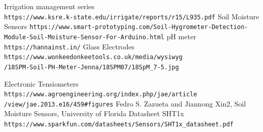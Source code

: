 \documentclass[11pt]{article}
\begin{document}
\begin{thebibliography}{9}
Irrigation management series\\
\texttt{https://www.ksre.k-state.edu/irrigate/reports/r15/L935.pdf}
Soil Moisture Sensors
\texttt{https://www.smart-prototyping.com/Soil-Hygrometer-Detection-\\Module-Soil-Moisture-Sensor-For-Arduino.html}
pH meter \\
\texttt{https://hannainst.in/}
Glass Electrodes
\texttt{https://www.wonkeedonkeetools.co.uk/media/wysiwyg\\/18SPM-Soil-PH-Meter-Jenna/18SPM07/18SpM_7-5.jpg}

Electronic Tensiometers
\texttt{https://www.agroengineering.org/index.php/jae/article\\/view/jae.2013.e16/459#figures}
Fedro S. Zazueta and Jiannong Xin2, Soil Moisture Sensors, University of Florida
Datasheet SHT1x
\texttt{https://www.sparkfun.com/datasheets/Sensors/SHT1x_datasheet.pdf}

\end{thebibliography}
\end{document}
